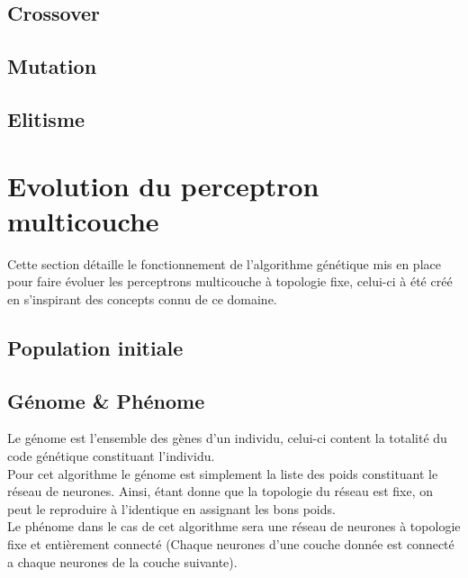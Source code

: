 \documentclass{article}
\begin{document}
\subsection{Crossover}
\subsection{Mutation}
\subsection{Elitisme}


\section{Evolution du perceptron multicouche}

Cette section détaille le fonctionnement de l'algorithme génétique mis en place pour faire évoluer les perceptrons multicouche à topologie fixe, celui-ci à été créé en s'inspirant des concepts connu de ce domaine.

\subsection{Population initiale}


\subsection{Génome \& Phénome}

Le génome est l'ensemble des gènes d'un individu, celui-ci content la totalité du code génétique constituant l'individu.\\

Pour cet algorithme le génome est simplement la liste des poids constituant le réseau de neurones. Ainsi, étant donne que la topologie du réseau est fixe, on peut le reproduire à l'identique en assignant les bons poids.\\

Le phénome dans le cas de cet algorithme sera une réseau de neurones à topologie fixe et entièrement connecté (Chaque neurones d'une couche donnée est connecté a chaque neurones de la couche suivante).
\end{document}
